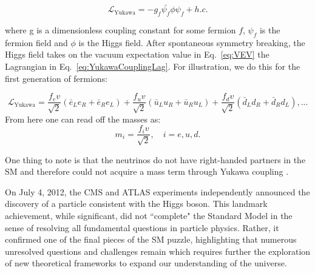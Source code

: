 \begin{equation}
    \label{eq:YukawaCouplingLag}
    \mathcal{L}_{\text{Yukawa}} = -g_f\bar{\psi_f} \phi \psi_f + h.c. 
\end{equation}

where g is a dimensionless coupling constant for some fermion $f$, $\psi_f$ is the fermion field and $\phi$ is the Higgs field. After spontaneous symmetry breaking, the Higgs field takes on the vacuum expectation value in Eq.~\ref{eq:VEV} the Lagrangian in Eq.~\ref{eq:YukawaCouplingLag}. For illustration, we do this for the first generation of fermions:

\begin{equation}
    \label{eq:YukVEV}
    \mathcal{L}_{\text{Yukawa}} =  \frac{f_e v}{\sqrt{2}} \left( \bar{e}_L e_R + \bar{e}_R e_L \right) + \frac{f_u v }{\sqrt{2}} \left( \bar{u}_L u_R + \bar{u}_R u_L \right) +  \frac{f_d v}{\sqrt{2}} \left( \bar{d}_L d_R + \bar{d}_R d_L \right), ...
\end{equation}
From here one can read off the masses as:
\begin{equation}
    \label{eq:FermionMasses}
   m_i = \frac{f_iv}{\sqrt{2}}, \quad i = e, u, d.
\end{equation}

One thing to note is that the neutrinos do not have right-handed partners in the SM and therefore could not acquire a mass term through Yukawa coupling \cite{Martin:1997ns}. 

On July 4, 2012, the CMS and ATLAS experiments independently announced the discovery of a particle consistent with the Higgs boson. This landmark achievement, while significant, did not ``complete" the Standard Model in the sense of resolving all fundamental questions in particle physics. Rather, it confirmed one of the final pieces of the SM puzzle, highlighting that numerous unresolved questions and challenges remain which requires further the exploration of new theoretical frameworks to expand our understanding of the universe.


